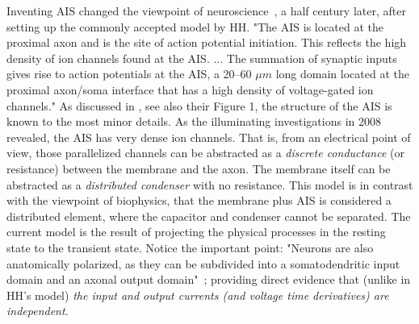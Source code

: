 Inventing \gls{AIS} changed the viewpoint of neuroscience~\cite{AIS_Updated_Viewpoint:2018}, a half century later, after setting up the commonly accepted model by \gls{HH}.
"The \gls{AIS} is located at the proximal axon and is the site of action potential initiation. This
reflects the high density of ion channels found at the \gls{AIS}.
... The summation of
synaptic inputs gives rise to action potentials at the
\gls{AIS}, a 20--60 $\mu m$ long domain
located at the proximal axon/soma interface that has
a high density of voltage-gated ion channels."	
As discussed in \cite{AISStructureReview:2018}, see also their Figure 1, 
the structure of the \gls{AIS}
is known to the most minor details.
As the illuminating investigations in 2008
\cite{ActionPotentialGenerationNatrium:2008}
revealed, the 
\gls{AIS}
has very dense ion channels. That is, from an electrical point
of view, those parallelized channels can be abstracted as a  \textit{discrete  conductance}
(or resistance) between the membrane and the axon.
The membrane itself can be abstracted as a \textit{distributed condenser} with no resistance.
This model is in contrast with the viewpoint of biophysics, that the membrane plus \gls{AIS}
is considered a distributed element, where the capacitor and condenser cannot be separated. The current model is the result of projecting the physical processes in the resting state to the transient state.
Notice the important point:
"Neurons are also anatomically polarized, as they can be
subdivided into a somatodendritic input domain and an axonal output domain"~\cite{AIS_NeuronalPolarity:2010};
providing direct evidence that (unlike in 
\gls{HH}'s
model)\textit{ the input and output currents (and voltage time derivatives) are independent}.

